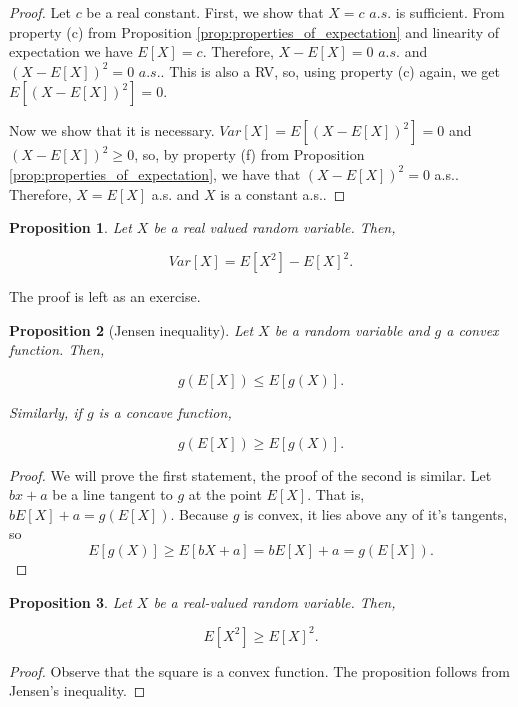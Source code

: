 \documentclass{book}
\theoremstyle{plain}%
\newtheorem{proposition}{Proposition}[section]
\theoremstyle{definition}
\begin{document}
\begin{proof}
Let $c$ be a real constant. First, we show that $X = c$ $a.s.$ is sufficient. From property (c) from Proposition \ref{prop:properties_of_expectation} and linearity of expectation we have $E[X] = c$. Therefore, $X - E[X] = 0$ $a.s.$ and $(X - E[X])^2 = 0$ $a.s.$. This is also a RV, so, using property (c) again, we get $E[(X - E[X])^2] = 0$.

Now we show that it is necessary. $Var[X] = E[(X - E[X])^2] = 0$ and $(X - E[X])^2 \geq 0$, so, by property (f) from Proposition \ref{prop:properties_of_expectation}, we have that $(X - E[X])^2 = 0$ a.s.. Therefore, $X = E[X]$ a.s. and $X$ is a constant a.s..
\end{proof}

\begin{proposition}
Let $X$ be a real valued random variable. Then,

$$Var[X] = E[X^2] - E[X]^2.$$\label{prop:variance}
\end{proposition}

The proof is left as an exercise.

\begin{proposition}[Jensen inequality]
Let $X$ be a random variable and $g$ a convex function. Then,

$$g(E[X]) \leq E[g(X)].$$

Similarly, if $g$ is a concave function,

$$g(E[X]) \geq E[g(X)].$$

\end{proposition}

\begin{proof}
We will prove the first statement, the proof of the second is similar. Let $bx + a$ be a line tangent to $g$ at the point $E[X]$. That is, $bE[X] + a = g(E[X])$. Because $g$ is convex, it lies above any of it's tangents, so
$$E[g(X)] \geq E[bX + a] = bE[X] + a = g(E[X]).$$ 
\end{proof}


\begin{proposition}
Let $X$ be a real-valued random variable. Then, 

$$E[X^2] \geq E[X]^2.$$\label{prop:varsum}
\end{proposition}

\begin{proof}
Observe that the square is a convex function. The proposition follows from Jensen's inequality.
\end{proof}
\end{document}
